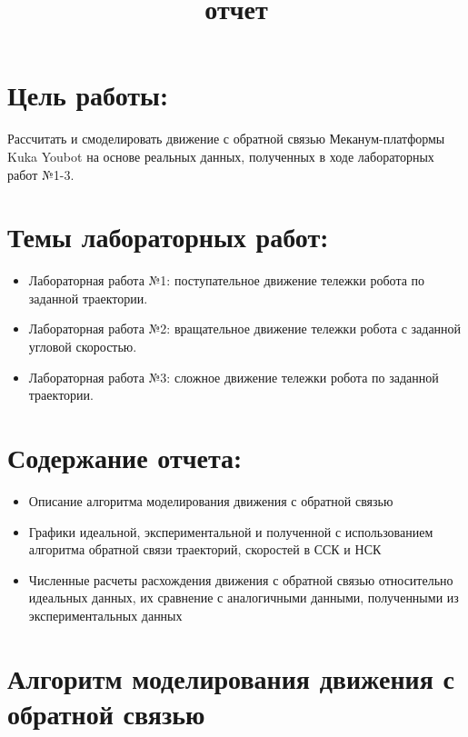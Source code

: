 \documentclass[
]{article}
\title{отчет}
\author{}
\date{}
\providecommand{\tightlist}{%
  \setlength{\itemsep}{0pt}\setlength{\parskip}{0pt}}
\begin{document}
\maketitle

\section{Цель
работы:}\label{ux446ux435ux43bux44c-ux440ux430ux431ux43eux442ux44b}

Рассчитать и смоделировать движение с обратной связью Меканум-платформы
Kuka Youbot на основе реальных данных, полученных в ходе лабораторных
работ №1-3.

\section{Темы лабораторных
работ:}\label{ux442ux435ux43cux44b-ux43bux430ux431ux43eux440ux430ux442ux43eux440ux43dux44bux445-ux440ux430ux431ux43eux442}

\begin{itemize}
\tightlist
\item
  Лабораторная работа №1: поступательное движение тележки робота по
  заданной траектории.
\item
  Лабораторная работа №2: вращательное движение тележки робота с
  заданной угловой скоростью.
\item
  Лабораторная работа №3: сложное движение тележки робота по заданной
  траектории.
\end{itemize}

\section{Содержание
отчета:}\label{ux441ux43eux434ux435ux440ux436ux430ux43dux438ux435-ux43eux442ux447ux435ux442ux430}

\begin{itemize}
\tightlist
\item
  Описание алгоритма моделирования движения с обратной связью
\item
  Графики идеальной, экспериментальной и полученной с использованием
  алгоритма обратной связи траекторий, скоростей в ССК и НСК
\item
  Численные расчеты расхождения движения с обратной связью относительно
  идеальных данных, их сравнение с аналогичными данными, полученными из
  экспериментальных данных
\end{itemize}

\section{Алгоритм моделирования движения с обратной
связью}\label{ux430ux43bux433ux43eux440ux438ux442ux43c-ux43cux43eux434ux435ux43bux438ux440ux43eux432ux430ux43dux438ux44f-ux434ux432ux438ux436ux435ux43dux438ux44f-ux441-ux43eux431ux440ux430ux442ux43dux43eux439-ux441ux432ux44fux437ux44cux44e}
\end{document}
